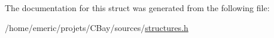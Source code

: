 The documentation for this struct was generated from the following file\-:\begin{DoxyCompactItemize}
\item 
/home/emeric/projets/\-C\-Bay/sources/\hyperlink{structures_8h}{structures.\-h}\end{DoxyCompactItemize}
